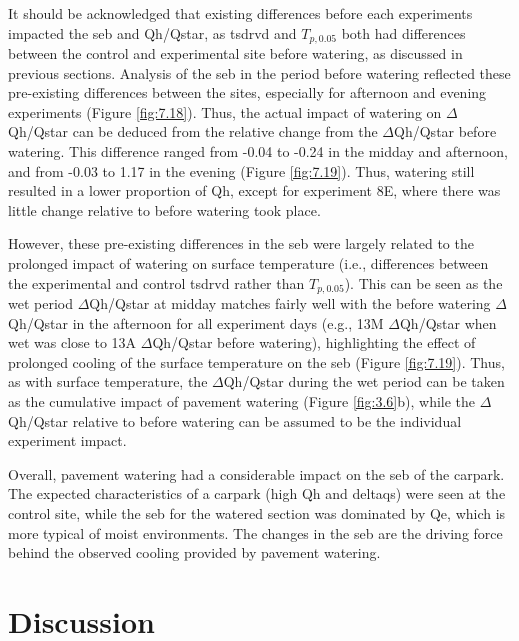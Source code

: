 \documentclass[final,3p,times,authoryear]{elsarticle}
\begin{document}
It should be acknowledged that existing differences before each experiments impacted the \gls{seb} and \gls{Qh}/\gls{Qstar}, as \gls{tsdrvd} and $T_{p,0.05}$ both had differences between the control and experimental site before watering, as discussed in previous sections. Analysis of the \gls{seb} in the period before watering reflected these pre-existing differences between the sites, especially for afternoon and evening experiments (Figure \ref{fig:7.18}). Thus, the actual impact of watering on $\Delta$\gls{Qh}/\gls{Qstar} can be deduced from the relative change from the $\Delta$\gls{Qh}/\gls{Qstar} before watering. This difference ranged from -0.04 to -0.24 in the midday and afternoon, and from -0.03 to 1.17 in the evening (Figure \ref{fig:7.19}). Thus, watering still resulted in a lower proportion of \gls{Qh}, except for experiment 8E, where there was little change relative to before watering took place.

However, these pre-existing differences in the \gls{seb} were largely related to the prolonged impact of watering on surface temperature (i.e., differences between the experimental and control \gls{tsdrvd} rather than $T_{p,0.05}$). This can be seen as the wet period $\Delta$\gls{Qh}/\gls{Qstar} at midday matches fairly well with the before watering $\Delta$\gls{Qh}/\gls{Qstar} in the afternoon for all experiment days (e.g., 13M $\Delta$\gls{Qh}/\gls{Qstar} when wet was close to 13A $\Delta$\gls{Qh}/\gls{Qstar} before watering), highlighting the effect of prolonged cooling of the surface temperature on the \gls{seb} (Figure \ref{fig:7.19}). Thus, as with surface temperature, the $\Delta$\gls{Qh}/\gls{Qstar} during the wet period can be taken as the cumulative impact of pavement watering (Figure \ref{fig:3.6}b), while the $\Delta$\gls{Qh}/\gls{Qstar} relative to before watering can be assumed to be the individual experiment impact.

Overall, pavement watering had a considerable impact on the \gls{seb} of the carpark. The expected characteristics of a carpark (high \gls{Qh} and \gls{deltaqs}) were seen at the control site, while the \gls{seb} for the watered section was dominated by \gls{Qe}, which is more typical of moist environments. The changes in the \gls{seb} are the driving force behind the observed cooling provided by pavement watering.

\section{Discussion}\label{sec:discussion}
 
\end{document}
